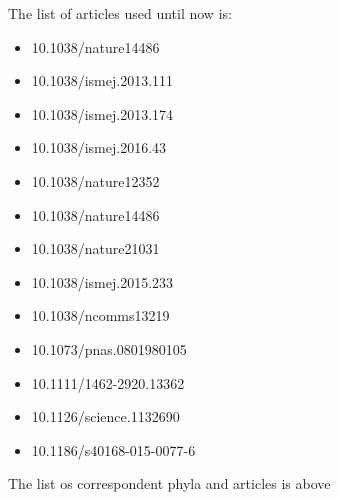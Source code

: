 \documentclass[12pt, a4paper]{report}
\begin{document}
The list of articles used until now is:
\begin{itemize}
\item 10.1038/nature14486
\item 10.1038/ismej.2013.111
\item 10.1038/ismej.2013.174
\item 10.1038/ismej.2016.43
\item 10.1038/nature12352
\item 10.1038/nature14486
\item 10.1038/nature21031
\item 10.1038/ismej.2015.233
\item 10.1038/ncomms13219
\item 10.1073/pnas.0801980105
\item 10.1111/1462-2920.13362
\item 10.1126/science.1132690
\item 10.1186/s40168-015-0077-6
\end{itemize}

\clearpage
\newpage
The list os correspondent phyla and articles is above\:
\end{document}
